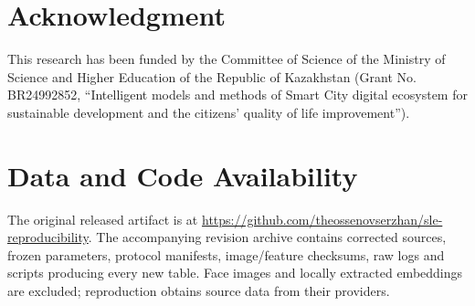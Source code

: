 \documentclass[journal]{IEEEtran}
\begin{document}
\section*{Acknowledgment}
This research has been funded by the Committee of Science of the Ministry of Science and Higher Education of the Republic of Kazakhstan (Grant No. BR24992852, ``Intelligent models and methods of Smart City digital ecosystem for sustainable development and the citizens' quality of life improvement'').
\section*{Data and Code Availability}
The original released artifact is at \url{https://github.com/theossenovserzhan/sle-reproducibility}. The accompanying revision archive contains corrected sources, frozen parameters, protocol manifests, image/feature checksums, raw logs and scripts producing every new table. Face images and locally extracted embeddings are excluded; reproduction obtains source data from their providers.


\end{document}
